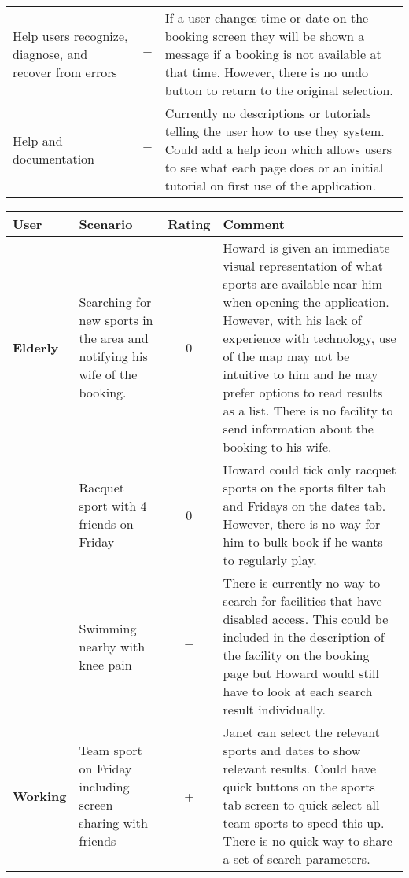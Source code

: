 \begin{center}
\begin{longtable}{p{} c p{}}
		Help users recognize, diagnose, and recover from errors & $-$ & If a
		user changes time or date on the booking screen they will be shown a
		message if a booking is not available at that time. However, there is
		no undo button to return to the original selection.\\

		Help and documentation & $-$ & Currently no descriptions or tutorials
		telling the user how to use they system. Could add a help icon which
		allows users to see what each page does or an initial tutorial on first
		use of the application.\\
		\bottomrule
	\end{longtable}
\end{center}

\begin{center}
	\renewcommand{\arraystretch}{2}
	\begin{longtable}{p{} p{} c p{}}
		\toprule
		\textbf{User} & \textbf{Scenario} & \textbf{Rating} & \textbf{Comment}\\
		\midrule
		\textbf{Elderly} & Searching for new sports in the area and notifying
		his wife of the booking. & 0 & Howard is given an immediate visual
		representation of what sports are available near him when opening the
		application. However, with his lack of experience with technology, use
		of the map may not be intuitive to him and he may prefer options to
		read results as a list. There is no facility to send information about
		the booking to his wife.\\

		& Racquet sport with 4 friends on Friday & 0 & Howard could tick only
		racquet sports on the sports filter tab and Fridays on the dates tab.
		However, there is no way for him to bulk book if he wants to regularly
		play.\\

		& Swimming nearby with knee pain & $-$ & There is currently no way to
		search for facilities that have disabled access. This could be included
		in the description of the facility on the booking page but Howard would
		still have to look at each search result individually.\\

		\midrule
		\textbf{Working} & Team sport on Friday including screen sharing with
		friends& + & Janet can select the relevant sports and dates to show
		relevant results. Could have quick buttons on the sports tab screen to
		quick select all team sports to speed this up. There is no quick way to
		share a set of search parameters.\\


\end{longtable}
\end{center}
